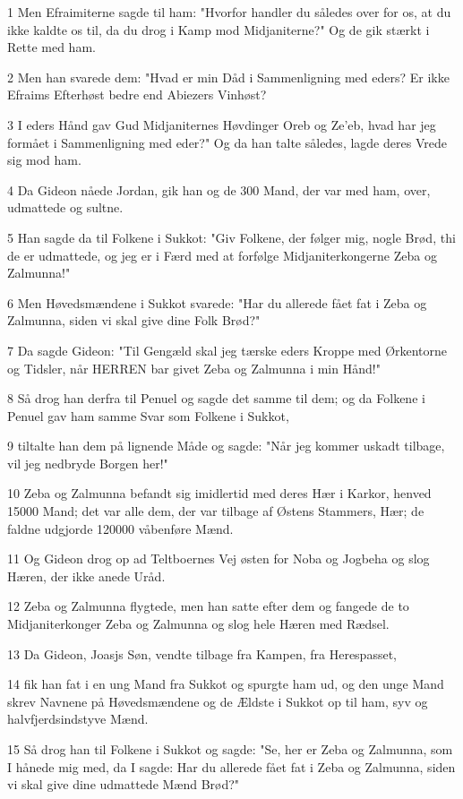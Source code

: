 \par 1 Men Efraimiterne sagde til ham: "Hvorfor handler du således over for os, at du ikke kaldte os til, da du drog i Kamp mod Midjaniterne?" Og de gik stærkt i Rette med ham.
\par 2 Men han svarede dem: "Hvad er min Dåd i Sammenligning med eders? Er ikke Efraims Efterhøst bedre end Abiezers Vinhøst?
\par 3 I eders Hånd gav Gud Midjaniternes Høvdinger Oreb og Ze'eb, hvad har jeg formået i Sammenligning med eder?" Og da han talte således, lagde deres Vrede sig mod ham.
\par 4 Da Gideon nåede Jordan, gik han og de 300 Mand, der var med ham, over, udmattede og sultne.
\par 5 Han sagde da til Folkene i Sukkot: "Giv Folkene, der følger mig, nogle Brød, thi de er udmattede, og jeg er i Færd med at forfølge Midjaniterkongerne Zeba og Zalmunna!"
\par 6 Men Høvedsmændene i Sukkot svarede: "Har du allerede fået fat i Zeba og Zalmunna, siden vi skal give dine Folk Brød?"
\par 7 Da sagde Gideon: "Til Gengæld skal jeg tærske eders Kroppe med Ørkentorne og Tidsler, når HERREN bar givet Zeba og Zalmunna i min Hånd!"
\par 8 Så drog han derfra til Penuel og sagde det samme til dem; og da Folkene i Penuel gav ham samme Svar som Folkene i Sukkot,
\par 9 tiltalte han dem på lignende Måde og sagde: "Når jeg kommer uskadt tilbage, vil jeg nedbryde Borgen her!"
\par 10 Zeba og Zalmunna befandt sig imidlertid med deres Hær i Karkor, henved 15000 Mand; det var alle dem, der var tilbage af Østens Stammers, Hær; de faldne udgjorde 120000 våbenføre Mænd.
\par 11 Og Gideon drog op ad Teltboernes Vej østen for Noba og Jogbeha og slog Hæren, der ikke anede Uråd.
\par 12 Zeba og Zalmunna flygtede, men han satte efter dem og fangede de to Midjaniterkonger Zeba og Zalmunna og slog hele Hæren med Rædsel.
\par 13 Da Gideon, Joasjs Søn, vendte tilbage fra Kampen, fra Herespasset,
\par 14 fik han fat i en ung Mand fra Sukkot og spurgte ham ud, og den unge Mand skrev Navnene på Høvedsmændene og de Ældste i Sukkot op til ham, syv og halvfjerdsindstyve Mænd.
\par 15 Så drog han til Folkene i Sukkot og sagde: "Se, her er Zeba og Zalmunna, som I hånede mig med, da I sagde: Har du allerede fået fat i Zeba og Zalmunna, siden vi skal give dine udmattede Mænd Brød?"
